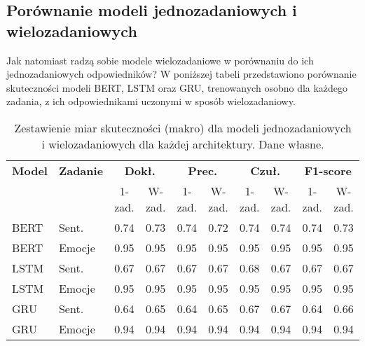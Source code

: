 \subsection{Porównanie modeli jednozadaniowych i wielozadaniowych}

Jak natomiast radzą sobie modele wielozadaniowe w porównaniu do ich jednozadaniowych odpowiedników? W poniższej tabeli przedstawiono porównanie skuteczności modeli BERT, LSTM oraz GRU, trenowanych osobno dla każdego zadania, z ich odpowiednikami uczonymi w sposób wielozadaniowy.

\begin{table}[H]
\centering
\label{tab:single_vs_multi}
\begin{tabular}{|l|l|c|c|c|c|c|c|c|c|}
\hline
\textbf{Model} & \textbf{Zadanie} &
\multicolumn{2}{c|}{\textbf{Dokł.}} &
\multicolumn{2}{c|}{\textbf{Prec.}} &
\multicolumn{2}{c|}{\textbf{Czuł.}} &
\multicolumn{2}{c|}{\textbf{F1-score}} \\
\cline{3-10}
 &  & 1-zad. & W-zad. & 1-zad. & W-zad. & 1-zad. & W-zad.  & 1-zad. & W-zad. \\
\hline
BERT & Sent. & 0.74 & \cellcolor{gray!20}0.73 & 0.74 & \cellcolor{gray!20}0.72 & 0.74 & \cellcolor{gray!20}0.74 & 0.74 & \cellcolor{gray!20}0.73 \\
BERT & Emocje    & 0.95 & \cellcolor{gray!20}0.95 & 0.95 & \cellcolor{gray!20}0.95 & 0.95 & \cellcolor{gray!20}0.95 & 0.95 & \cellcolor{gray!20}0.95 \\
\hline
LSTM & Sent. & 0.67 & \cellcolor{gray!20}0.67 & 0.67 & \cellcolor{gray!20}0.67 & 0.68 & \cellcolor{gray!20}0.67 & 0.67 & \cellcolor{gray!20}0.67 \\
LSTM & Emocje    & 0.95 & \cellcolor{gray!20}0.95 & 0.95 & \cellcolor{gray!20}0.95 & 0.95 & \cellcolor{gray!20}0.95 & 0.95 & \cellcolor{gray!20}0.95 \\
\hline
GRU  & Sent. & 0.64 & \cellcolor{gray!20}0.65 & 0.64 & \cellcolor{gray!20}0.65 & 0.67 & \cellcolor{gray!20}0.67 & 0.64 & \cellcolor{gray!20}0.66 \\
GRU  & Emocje    & 0.94 & \cellcolor{gray!20}0.94 & 0.94 & \cellcolor{gray!20}0.94 & 0.94 & \cellcolor{gray!20}0.94 & 0.94 & \cellcolor{gray!20}0.94 \\
\hline
\end{tabular}
\caption{Zestawienie miar skuteczności (makro) dla modeli jednozadaniowych\\i wielozadaniowych dla każdej architektury. Dane własne.}
\end{table}

